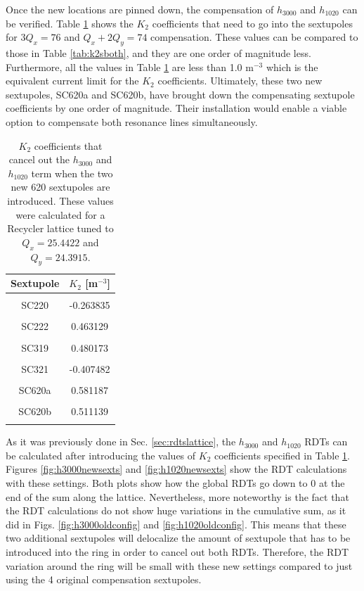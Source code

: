 Once the new locations are pinned down, the compensation of $h_{3000}$ and $h_{1020}$ can be verified. Table \ref{tab:k2s620} shows the $K_2$ coefficients that need to go into the sextupoles for $3Q_x=76$ and $Q_x+ 2Q_y = 74$ compensation. These values can be compared to those in Table \ref{tab:k2sboth}, and they are one order of magnitude less. Furthermore, all the values in Table \ref{tab:k2s620} are less than 1.0 m$^{-3}$ which is the equivalent current limit for the $K_2$ coefficients. Ultimately, these two new sextupoles, SC620a and SC620b, have brought down the compensating sextupole coefficients by one order of magnitude. Their installation would enable a viable option to compensate both resonance lines simultaneously. 

\begin{table}[H]
    \centering
    \caption{$K_2$ coefficients that cancel out the $h_{3000}$ and $h_{1020}$ term when the two new 620 sextupoles are introduced. These values were calculated for a Recycler lattice tuned to $Q_x=25.4422$ and $Q_y=24.3915$.}
    \label{tab:k2s620}
    \begin{tabular}{cc}
    \toprule
    \textbf{Sextupole} & $K_2$ [m$^{-3}$] \\ \midrule
     &  \\
    SC220 & -0.263835 \\
     &  \\
    SC222 & 0.463129 \\
     &  \\
    SC319 & 0.480173 \\
     &  \\
    SC321 & -0.407482 \\
     &  \\
    SC620a & 0.581187 \\
     &  \\ 
    SC620b & 0.511139 \\
     &  \\ \bottomrule
    \end{tabular}
\end{table}

As it was previously done in Sec. \ref{sec:rdtslattice}, the $h_{3000}$ and $h_{1020}$ RDTs can be calculated after introducing the values of $K_2$ coefficients specified in Table \ref{tab:k2s620}. Figures \ref{fig:h3000newsexts} and \ref{fig:h1020newsexts} show the RDT calculations with these settings. Both plots show how the global RDTs go down to 0 at the end of the sum along the lattice. Nevertheless, more noteworthy is the fact that the RDT calculations do not show huge variations in the cumulative sum, as it did in Figs. \ref{fig:h3000oldconfig} and \ref{fig:h1020oldconfig}. This means that these two additional sextupoles will delocalize the amount of sextupole that has to be introduced into the ring in order to cancel out both RDTs. Therefore, the RDT variation around the ring will be small with these new settings compared to just using the 4 original compensation sextupoles.

